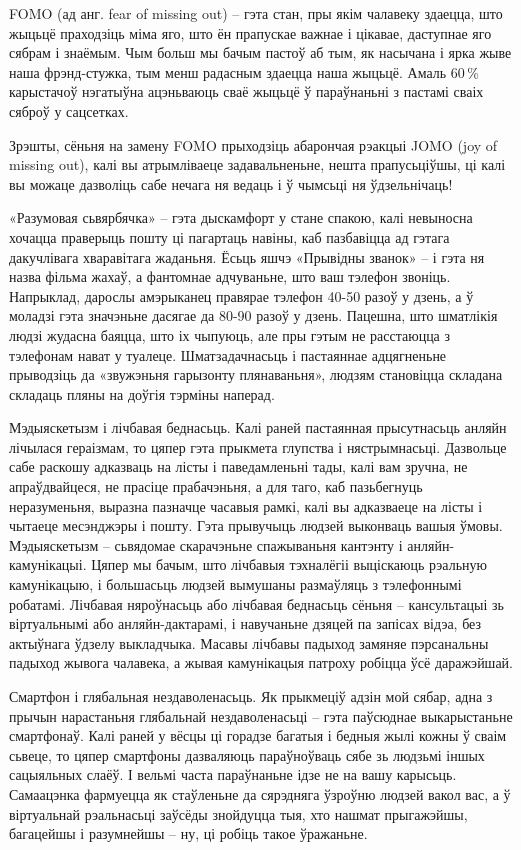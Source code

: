 FOMO (ад анг. fear of missing out) – гэта стан, пры якім чалавеку здаецца, што жыцьцё праходзіць міма яго, што ён прапускае важнае і цікавае, даступнае яго сябрам і знаёмым. Чым больш мы бачым пастоў аб тым, як насычана і ярка жыве наша фрэнд-стужка, тым менш радасным здаецца наша жыцьцё. Амаль 60\,\% карыстачоў нэгатыўна ацэньваюць сваё жыцьцё ў параўнаньні з пастамі сваіх сяброў у сацсетках. 

Зрэшты, сёньня на замену FOMO прыходзіць абарончая рэакцыі JOMO (joy of missing out), калі вы атрымліваеце задавальненьне, нешта прапусьціўшы, ці калі вы можаце дазволіць сабе нечага ня ведаць і ў чымсьці ня ўдзельнічаць!

«Разумовая сьвярбячка» – гэта дыскамфорт у стане спакою, калі невыносна хочацца праверыць пошту ці пагартаць навіны, каб пазбавіцца ад гэтага дакучлівага хваравітага жаданьня. Ёсьць яшчэ «Прывідны званок» – і гэта ня назва фільма жахаў, а фантомнае адчуваньне, што ваш тэлефон звоніць. Напрыклад, дарослы амэрыканец правярае тэлефон 40-50 разоў у дзень, а ў моладзі гэта значэньне дасягае да 80-90 разоў у дзень. Пацешна, што шматлікія людзі жудасна баяцца, што іх чыпуюць, але пры гэтым не расстаюцца з тэлефонам нават у туалеце. Шматзадачнасьць і пастаяннае адцягненьне прыводзіць да «звужэньня гарызонту плянаваньня», людзям становіцца складана складаць пляны на доўгія тэрміны наперад.

Мэдыяскетызм і лічбавая беднасьць. Калі раней пастаянная прысутнасьць анляйн лічылася гераізмам, то цяпер гэта прыкмета глупства і нястрымнасьці. Дазвольце сабе раскошу адказваць на лісты і паведамленьні тады, калі вам зручна, не апраўдвайцеся, не прасіце прабачэньня, а для таго, каб пазьбегнуць неразуменьня, выразна пазначце часавыя рамкі, калі вы адказваеце на лісты і чытаеце месэнджэры і пошту. Гэта прывучыць людзей выконваць вашыя ўмовы. Мэдыяскетызм – сьвядомае скарачэньне спажываньня кантэнту і анляйн-камунікацыі. Цяпер мы бачым, што лічбавыя тэхналёгіі выціскаюць рэальную камунікацыю, і большасьць людзей вымушаны размаўляць з тэлефоннымі робатамі. Лічбавая няроўнасьць або лічбавая беднасьць сёньня – кансультацыі зь віртуальнымі або анляйн-дактарамі, і навучаньне дзяцей па запісах відэа, без актыўнага ўдзелу выкладчыка. Масавы лічбавы падыход замяняе пэрсанальны падыход жывога чалавека, а жывая камунікацыя патроху робіцца ўсё даражэйшай.

Смартфон і глябальная нездаволенасьць. Як прыкмеціў адзін мой сябар, адна з прычын нарастаньня глябальнай нездаволенасьці – гэта паўсюднае выкарыстаньне смартфонаў. Калі раней у вёсцы ці горадзе багатыя і бедныя жылі кожны ў сваім сьвеце, то цяпер смартфоны дазваляюць параўноўваць сябе зь людзьмі іншых сацыяльных слаёў. І вельмі часта параўнаньне ідзе не на вашу карысьць. Самаацэнка фармуецца як стаўленьне да сярэдняга ўзроўню людзей вакол вас, а ў віртуальнай рэальнасьці заўсёды знойдуцца тыя, хто нашмат прыгажэйшы, багацейшы і разумнейшы – ну, ці робіць такое ўражаньне.

